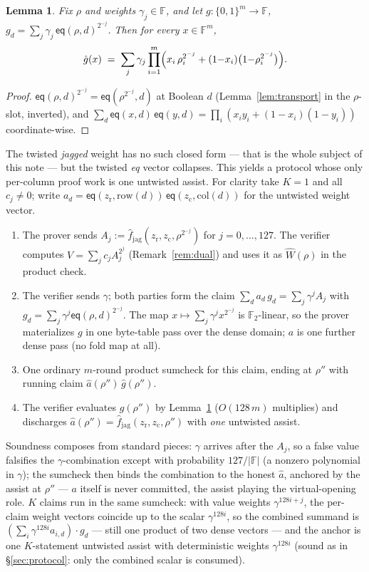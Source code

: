 \documentclass[11pt]{article}
\newcommand{\F}{\mathbb{F}}
\newcommand{\Ftwo}{\F_2}
\newcommand{\eq}{\mathsf{eq}}
\newcommand{\rowof}{\mathrm{row}}
\newcommand{\colof}{\mathrm{col}}
\newcommand{\fjag}{\hat f_{\mathrm{jag}}}
\newtheorem{lemma}[theorem]{Lemma}
\begin{document}
\begin{lemma}\label{lem:twisted-eq}
Fix $\rho$ and weights $\gamma_j \in \F$, and let
$g : \{0,1\}^m \to \F$, $g_d = \sum_j \gamma_j\,
\eq(\rho, d)^{2^{-j}}$. Then for every $x \in \F^m$,
\[
  \hat g(x)
  \;=\;
  \sum_j \gamma_j \prod_{i=1}^{m}
  \Bigl(x_i\,\rho_i^{2^{-j}} + (1{-}x_i)\bigl(1{-}\rho_i^{2^{-j}}\bigr)\Bigr).
\]
\end{lemma}

\begin{proof}
$\eq(\rho,d)^{2^{-j}} = \eq(\rho^{2^{-j}}, d)$ at Boolean $d$
(Lemma~\ref{lem:transport} in the $\rho$-slot, inverted), and
$\sum_{d} \eq(x,d)\,\eq(y,d) = \prod_i (x_i y_i +
(1{-}x_i)(1{-}y_i))$ coordinate-wise.
\end{proof}

The twisted \emph{jagged} weight has no such closed form --- that is
the whole subject of this note --- but the twisted \emph{eq} vector
collapses. This yields a protocol whose only per-column proof work is
one untwisted assist. For clarity take $K = 1$ and all $c_j \ne 0$;
write $a_d = \eq(z_{\mathrm r}, \rowof(d))\,\eq(z_{\mathrm c},
\colof(d))$ for the untwisted weight vector.

\begin{enumerate}[nosep]
\item The prover sends $A_j := \fjag(z_{\mathrm r}, z_{\mathrm c},
  \rho^{2^{-j}})$ for $j = 0, \dots, 127$. The verifier computes
  $V = \sum_j c_j A_j^{2^j}$ (Remark~\ref{rem:dual}) and uses it as
  $\widehat W(\rho)$ in the product check.
\item The verifier sends $\gamma$; both parties form the claim
  $\sum_d a_d\, g_d = \sum_j \gamma^j A_j$ with
  $g_d = \sum_j \gamma^j \eq(\rho,d)^{2^{-j}}$. The map $x \mapsto
  \sum_j \gamma^j x^{2^{-j}}$ is $\Ftwo$-linear, so the prover
  materializes $g$ in one byte-table pass over the dense domain; $a$
  is one further dense pass (no fold map at all).
\item One ordinary $m$-round product sumcheck for this claim, ending
  at $\rho''$ with running claim $\hat a(\rho'')\,\hat g(\rho'')$.
\item The verifier evaluates $\hat g(\rho'')$ by
  Lemma~\ref{lem:twisted-eq} ($O(128\,m)$ multiplies) and discharges
  $\hat a(\rho'') = \fjag(z_{\mathrm r}, z_{\mathrm c}, \rho'')$ with
  \emph{one} untwisted assist.
\end{enumerate}

Soundness composes from standard pieces: $\gamma$ arrives after the
$A_j$, so a false value falsifies the $\gamma$-combination except with
probability $127/|\F|$ (a nonzero polynomial in $\gamma$); the
sumcheck then binds the combination to the honest $\hat a$, anchored
by the assist at $\rho''$ --- $a$ itself is never committed, the
assist playing the virtual-opening role. $K$ claims run in the same
sumcheck: with value weights $\gamma^{128 i + j}$, the per-claim
weight vectors coincide up to the scalar $\gamma^{128 i}$, so the
combined summand is $(\sum_i \gamma^{128 i} a_{i,d})\cdot g_d$ ---
still one product of two dense vectors --- and the anchor is one
$K$-statement untwisted assist with deterministic weights
$\gamma^{128 i}$ (sound as in \S\ref{sec:protocol}: only the combined
scalar is consumed).
\end{document}
